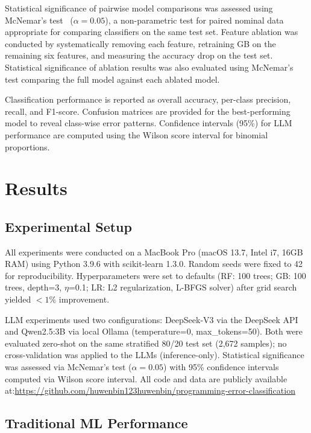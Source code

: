 \documentclass[acmsmall]{acmart}
\begin{document}
Statistical significance of pairwise model comparisons was assessed using
McNemar's test~\cite{mcnemar1947note} ($\alpha = 0.05$), a non-parametric test
for paired nominal data appropriate for comparing classifiers on the same test
set. Feature ablation was conducted by systematically removing each feature,
retraining GB on the remaining six features, and measuring the accuracy
drop on the test set. Statistical significance of ablation results was also
evaluated using McNemar's test comparing the full model against each ablated
model.

Classification performance is reported as overall accuracy, per-class
precision, recall, and F1-score. Confusion matrices are provided for the
best-performing model to reveal class-wise error patterns. Confidence
intervals (95\%) for LLM performance are computed using the Wilson score
interval for binomial proportions.

\section{Results}

\subsection{Experimental Setup}

All experiments were conducted on a MacBook Pro (macOS 13.7, Intel i7, 16GB
RAM) using Python 3.9.6 with scikit-learn 1.3.0. Random seeds were fixed to
42 for reproducibility. Hyperparameters were set to defaults (RF: 100 trees;
GB: 100 trees, depth=3, $\eta$=0.1; LR: L2 regularization, L-BFGS solver)
after grid search yielded $<1\%$ improvement.

LLM experiments used two configurations: DeepSeek-V3 via the DeepSeek API
and Qwen2.5:3B via local Ollama (temperature=0, max\_tokens=50). Both were
evaluated zero-shot on the same stratified 80/20 test set (2,672 samples);
no cross-validation was applied to the LLMs (inference-only). Statistical
significance was assessed via McNemar's test
($\alpha=0.05$) with 95\% confidence intervals computed via Wilson score
interval. All code and data are publicly available
at:\url{https://github.com/huwenbin123huwenbin/programming-error-classification}

\subsection{Traditional ML Performance}
\end{document}
